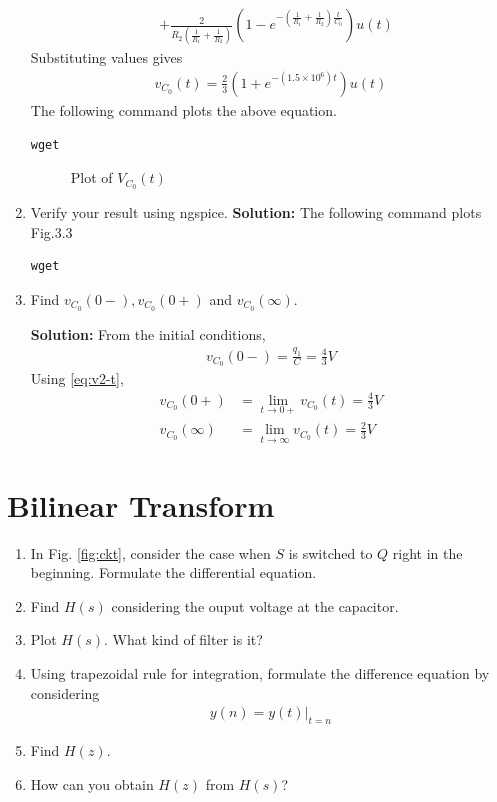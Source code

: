 \documentclass[journal,12pt,twocolumn]{IEEEtran}
\newcommand{\solution}{\noindent \textbf{Solution: }}
\providecommand{\brak}[1]{\ensuremath{\left(#1\right)}}
\numberwithin{equation}{section}
\renewcommand\thesection{\arabic{section}}
\begin{document}
\begin{enumerate}[label=\arabic*.,ref=\thesection.\theenumi]
\begin{align}
    &+ \frac{2}{R_2\brak{\frac{1}{R_1}+\frac{1}{R_2}}}\brak{1 - e^{-\brak{\frac{1}{R_1} + \frac{1}{R_2}}\frac{t}{C_0}}}u(t)
\end{align}
Substituting values gives
\begin{align}
    v_{C_0}(t) = \frac{2}{3}\brak{1 +e^{-\brak{1.5 \times 10^6}t}}u(t)
    \label{eq:v2-t}
\end{align}
The following command plots the above equation.
	\begin{lstlisting}
wget	
\end{lstlisting}
\begin{figure}[!ht]
			\centering
			\caption{Plot of $V_{C_0}(t)$}
\end{figure}
	\item Verify your result using ngspice.
	\solution The following command plots Fig.3.3
	\begin{lstlisting}
wget 
\end{lstlisting}
	 \begin{figure}[!ht]
			\centering
			\caption{}
\end{figure}
	\item Find $v_{C_0}(0-), v_{C_0}(0+)$ and  $v_{C_0}(\infty) $. 

\solution From the initial conditions,
\begin{align}
    v_{C_0}(0-) = \frac{q_1}{C} = {\frac{4}{3}}{V}
\end{align}
Using \eqref{eq:v2-t},
\begin{align}
    v_{C_0}(0+) &= \lim_{t \to 0+}v_{C_0}(t) = {\frac{4}{3}}{V} \\
    v_{C_0}(\infty) &= \lim_{t \to \infty}v_{C_0}(t) = {\frac{2}{3}}{V}
\end{align}
	\end{enumerate}
 \section{Bilinear Transform}
\begin{enumerate}[label=\arabic*.,ref=\thesection.\theenumi]
\item In Fig. 
			\ref{fig:ckt},
			consider the case when $S$ is switched to $Q$ right in the beginning. Formulate the differential equation.
		\item 			Find $H(s)$ considering the ouput voltage at the capacitor.
		\item Plot $H(s)$.  What kind of filter is it?
		\item Using trapezoidal rule for integration, formulate the difference equation
			by considering 
		\begin{align}
			y(n) = y(t)\vert_{t=n}
		\end{align}
	\item Find $H(z)$.
	\item How can you obtain $H(z)$ from $H(s)$?
	\end{enumerate}
\end{document}
